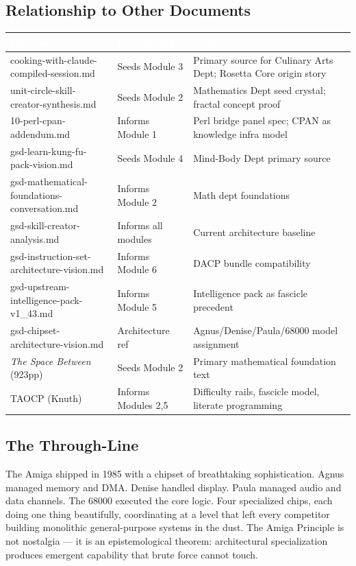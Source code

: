 \documentclass[11pt,letterpaper]{article}
\newcommand{\tableheader}[1]{\textbf{\sffamily\textcolor{white}{#1}}}
\begin{document}
\subsection{Relationship to Other Documents}

\begin{center}
\begin{tabularx}{\textwidth}{L{3.5cm}L{3cm}X}
\toprule
{}
\tableheader{Document} & \tableheader{Relationship} & \tableheader{Notes} \\
\midrule
cooking-with-claude-compiled-session.md & Seeds Module 3 & Primary source for Culinary Arts Dept; Rosetta Core origin story \\
unit-circle-skill-creator-synthesis.md & Seeds Module 2 & Mathematics Dept seed crystal; fractal concept proof \\
10-perl-cpan-addendum.md & Informs Module 1 & Perl bridge panel spec; CPAN as knowledge infra model \\
gsd-learn-kung-fu-pack-vision.md & Seeds Module 4 & Mind-Body Dept primary source \\
gsd-mathematical-foundations-conversation.md & Informs Module 2 & Math dept foundations \\
gsd-skill-creator-analysis.md & Informs all modules & Current architecture baseline \\
gsd-instruction-set-architecture-vision.md & Informs Module 6 & DACP bundle compatibility \\
gsd-upstream-intelligence-pack-v1\_43.md & Informs Module 5 & Intelligence pack as fascicle precedent \\
gsd-chipset-architecture-vision.md & Architecture ref & Agnus/Denise/Paula/68000 model assignment \\
\textit{The Space Between} (923pp) & Seeds Module 2 & Primary mathematical foundation text \\
TAOCP (Knuth) & Informs Modules 2,5 & Difficulty rails, fascicle model, literate programming \\
\bottomrule
\end{tabularx}
\end{center}

\subsection{The Through-Line}

The Amiga shipped in 1985 with a chipset of breathtaking sophistication. Agnus managed memory and DMA. Denise handled display. Paula managed audio and data channels. The 68000 executed the core logic. Four specialized chips, each doing one thing beautifully, coordinating at a level that left every competitor building monolithic general-purpose systems in the dust. The Amiga Principle is not nostalgia --- it is an epistemological theorem: architectural specialization produces emergent capability that brute force cannot touch.
\end{document}
